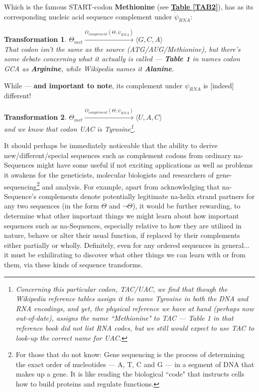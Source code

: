 \documentclass[a4paper, 18pt]{book} %
\newtheorem{trans}{Transformation}
\begin{document}
Which is the famous START-codon \textbf{Methionine} (see \textbf{\hyperref[TAB2]{Table \ref{TAB2}}}), has as its corresponding nucleic acid sequence complement under $\dot{\psi}_{RNA}$:

\begin{trans}
\label{TRANSGCA}
$\Theta_{met} \xrightarrow{O_{complement}(\Theta,\dot{\psi}_{RNA})}  \langle G, C, A \rangle$\\
That codon isn't the same as the source (ATG/AUG/Methionine), but there's some debate concerning what it actually is called --- \textbf{Table 1} in \cite{gregory1987oxford} names codon GCA as \textbf{Arginine}, while Wikipedia\cite{wikipedia_codon_tables} names it \textbf{Alanine}.
\end{trans}

While --- \textbf{and important to note}, its complement under $\psi_{RNA}$ is [indeed] different!

\begin{trans}
\label{TRANSUAC}
$\Theta_{met} \xrightarrow{O_{complement}(\Theta,\psi_{RNA})}  \langle U, A, C \rangle$
\\
and we know that codon UAC is Tyrosine\cite{wikipedia_codon_tables}\footnote{Concerning this particular codon, TAC/UAC, we find that though the Wikipedia reference tables assign it the name Tyrosine in both the DNA and RNA encodings, and yet, the physical reference we have at hand\cite{gregory1987oxford} (perhaps now out-of-date), assigns the name ``Methionine" to TAC --- Table 1 in that reference book did not list RNA codes, but we still would expect to use TAC to look-up the correct name for UAC.}.
\end{trans}

It should perhaps be immediately noticeable that the ability to derive new/different/special sequences such as complement codons from ordinary na-Sequences might have some useful if not exciting applications as well as problems it awakens for the geneticists, molecular biologists and researchers of gene-sequencing\footnote{For those that do not know: Gene sequencing is the process of determining the exact order of nucleotides --- A, T, C and G --- in a segment of DNA that makes up a gene. It is like reading the biological ``code" that instructs cells how to build proteins and regulate functions\cite{copilot_dna_assistant}.} and analysis. For example, apart from acknowledging that na-Sequence's complements denote potentially legitimate na-helix strand partners for any two sequences (in the form $\Theta$ and $\lnot\Theta$), it would be further rewarding, to determine what other important things we might learn about how important sequences such as na-Sequences, especially relative to how they are utilized in nature, behave or alter their usual function, if replaced by their complements either partially or wholly. Definitely, even for any ordered sequences in general... it must be exhilirating to discover what other things we can learn with or from them, via these kinds of sequence transforms. 
\end{document}
